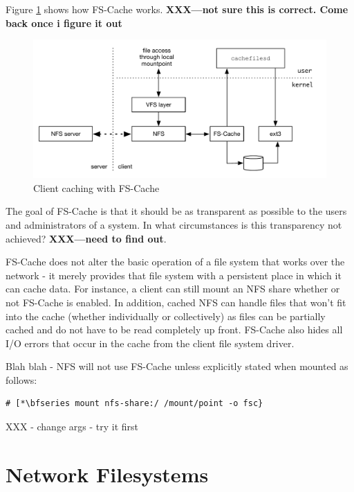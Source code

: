 \noindent
Figure \ref{fig:fscache} shows how FS-Cache works. \textbf{XXX---not sure this is correct. Come back once i figure it out}

\begin{figure}[h]
	\includegraphics[scale=0.6]{figures/fscache.pdf}
	\centering
	\caption{Client caching with FS-Cache}
	\label{fig:fscache}
\end{figure}

\noindent
The goal of FS-Cache is that it should be as transparent as possible to the users and administrators of a system. In what circumstances is this transparency not achieved? \textbf{XXX---need to find out}.

FS-Cache does not alter the basic operation of a file system that works over the network - it merely provides that file system with a persistent place in which it can cache data. For instance, a client can still mount an NFS share whether or not FS-Cache is enabled. In addition, cached NFS can handle files that won't fit into the cache (whether individually or collectively) as files can be partially cached and do not have to be read completely up front. FS-Cache also hides all I/O errors that occur in the cache from the client file system driver.

Blah blah - NFS will not use FS-Cache unless explicitly stated when mounted as follows:

\begin{lstlisting}
# [*\bfseries mount nfs-share:/ /mount/point -o fsc}
\end{lstlisting}

\noindent
XXX - change args - try it first


\section{Network Filesystems}

